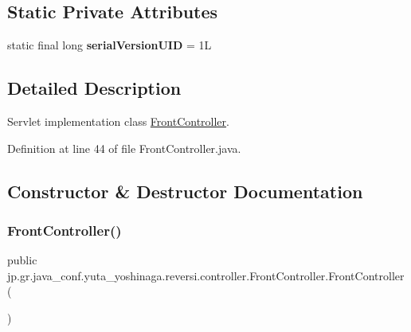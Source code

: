\subsection*{Static Private Attributes}
\begin{DoxyCompactItemize}
\item 
\mbox{\label{classjp_1_1gr_1_1java__conf_1_1yuta__yoshinaga_1_1reversi_1_1controller_1_1_front_controller_a42e40239dd4f246bd1524cdb08ca41af}} 
static final long {\bfseries serial\+Version\+U\+ID} = 1L
\end{DoxyCompactItemize}


\subsection{Detailed Description}
Servlet implementation class \mbox{\hyperlink{classjp_1_1gr_1_1java__conf_1_1yuta__yoshinaga_1_1reversi_1_1controller_1_1_front_controller}{Front\+Controller}}. 

Definition at line 44 of file Front\+Controller.\+java.



\subsection{Constructor \& Destructor Documentation}
\mbox{\label{classjp_1_1gr_1_1java__conf_1_1yuta__yoshinaga_1_1reversi_1_1controller_1_1_front_controller_a918d736b7b4d8672076c15f8ca05075c}} 
\subsubsection{\texorpdfstring{Front\+Controller()}{FrontController()}}
{\footnotesize\ttfamily public jp.\+gr.\+java\+\_\+conf.\+yuta\+\_\+yoshinaga.\+reversi.\+controller.\+Front\+Controller.\+Front\+Controller (\begin{DoxyParamCaption}{ }\end{DoxyParamCaption})}



